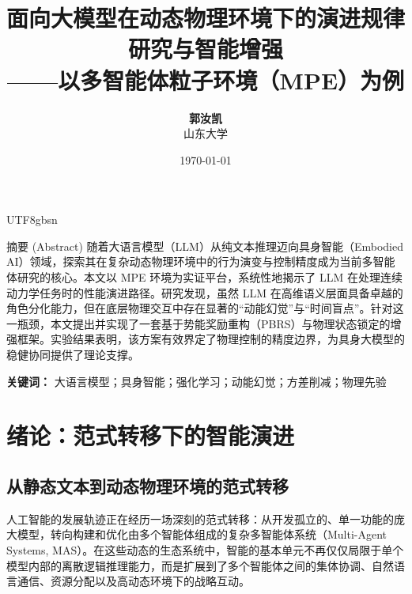 \documentclass[11pt,a4paper]{article}
\title{\textbf{\huge 面向大模型在动态物理环境下的演进规律研究与智能增强} \\ \vspace{0.5cm} \large ——以多智能体粒子环境（MPE）为例}
\author{\Large \textbf{郭汝凯} \\ \large 山东大学}
\date{\today}
\begin{document}
\begin{CJK*}{UTF8}{gbsn}

\maketitle
\thispagestyle{empty} 

\vspace{1.5cm}

\begin{mathBox}{摘要 (Abstract)}
随着大语言模型（LLM）从纯文本推理迈向具身智能（Embodied AI）领域，探索其在复杂动态物理环境中的行为演变与控制精度成为当前多智能体研究的核心。本文以 MPE 环境为实证平台，系统性地揭示了 LLM 在处理连续动力学任务时的性能演进路径。研究发现，虽然 LLM 在高维语义层面具备卓越的角色分化能力，但在底层物理交互中存在显著的“动能幻觉”与“时间盲点”。针对这一瓶颈，本文提出并实现了一套基于势能奖励重构（PBRS）与物理状态锁定的增强框架。实验结果表明，该方案有效界定了物理控制的精度边界，为具身大模型的稳健协同提供了理论支撑。
\end{mathBox}

\vspace{0.8cm}
\noindent \textbf{关键词：} 大语言模型；具身智能；强化学习；动能幻觉；方差削减；物理先验

\newpage

\renewcommand{\contentsname}{\centering \textcolor{SDUBlue}{目~录}} 
\vspace*{1cm}
\tableofcontents
\newpage 

\setcounter{page}{1}   

\section{绪论：范式转移下的智能演进}

\subsection{从静态文本到动态物理环境的范式转移}
人工智能的发展轨迹正在经历一场深刻的范式转移：从开发孤立的、单一功能的庞大模型，转向构建和优化由多个智能体组成的复杂多智能体系统（Multi-Agent Systems, MAS）。在这些动态的生态系统中，智能的基本单元不再仅仅局限于单个模型内部的离散逻辑推理能力，而是扩展到了多个智能体之间的集体协调、自然语言通信、资源分配以及高动态环境下的战略互动。


\end{CJK*}
\end{document}
